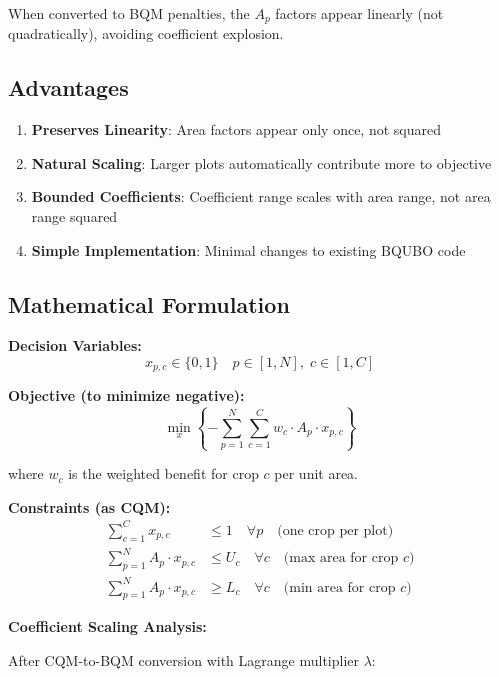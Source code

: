 \documentclass[11pt,a4paper]{article}
\begin{document}
When converted to BQM penalties, the $A_p$ factors appear linearly (not quadratically), avoiding coefficient explosion.

\subsection{Advantages}

\begin{enumerate}
    \item \textbf{Preserves Linearity}: Area factors appear only once, not squared
    \item \textbf{Natural Scaling}: Larger plots automatically contribute more to objective
    \item \textbf{Bounded Coefficients}: Coefficient range scales with area range, not area range squared
    \item \textbf{Simple Implementation}: Minimal changes to existing BQUBO code
\end{enumerate}

\subsection{Mathematical Formulation}

\textbf{Decision Variables:}
\begin{equation}
x_{p,c} \in \{0,1\} \quad p \in [1,N], \; c \in [1,C]
\end{equation}

\textbf{Objective (to minimize negative):}
\begin{equation}
\min_{x} \left\{ -\sum_{p=1}^{N} \sum_{c=1}^{C} w_c \cdot A_p \cdot x_{p,c} \right\}
\end{equation}

where $w_c$ is the weighted benefit for crop $c$ per unit area.

\textbf{Constraints (as CQM):}
\begin{align}
\sum_{c=1}^{C} x_{p,c} &\leq 1 \quad \forall p \quad \text{(one crop per plot)} \\
\sum_{p=1}^{N} A_p \cdot x_{p,c} &\leq U_c \quad \forall c \quad \text{(max area for crop $c$)} \\
\sum_{p=1}^{N} A_p \cdot x_{p,c} &\geq L_c \quad \forall c \quad \text{(min area for crop $c$)}
\end{align}

\textbf{Coefficient Scaling Analysis:}

After CQM-to-BQM conversion with Lagrange multiplier $\lambda$:
\end{document}
